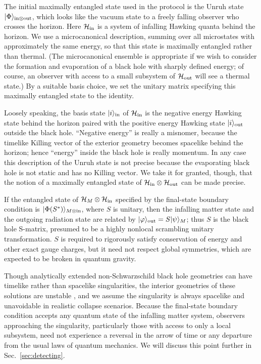 \documentclass[11pt]{article}
\begin{document}
The initial maximally entangled state used in the protocol is the Unruh state $|\Phi\rangle_{{\rm in}\otimes {\rm out}}$, which looks like the vacuum state to a freely falling observer who crosses the horizon. Here $\mathcal{H}_{\rm in}$ is a system of infalling Hawking quanta behind the horizon. We use a microcanonical description, summing over all microstates with approximately the same energy, so that this state is maximally entangled rather than thermal. (The microcanonical ensemble is appropriate if we wish to consider the formation and evaporation of a black hole with sharply defined energy; of course, an observer with access to a small subsystem of $\mathcal{H}_{\rm out}$ will see a thermal state.) By a suitable basis choice, we set the unitary matrix specifying this maximally entangled state to the identity. 

Loosely speaking, the basis state $|i\rangle_{\rm in}$ of $\mathcal{H}_{\rm in}$ is the negative energy Hawking state behind the horizon paired with the positive energy Hawking state $|i\rangle_{\rm out}$ outside the black hole. ``Negative energy'' is really a misnomer, because the timelike Killing vector of the exterior geometry becomes spacelike behind the horizon; hence ``energy'' inside the black hole is really momentum. In any case this description of the Unruh state is not precise because the evaporating black hole is not static and has no Killing vector. We take it for granted, though, that the notion of a maximally entangled state of $\mathcal{H}_{\rm in}\otimes \mathcal{H}_{\rm out}$ can be made precise.

If the entangled state of $\mathcal{H}_M\otimes \mathcal{H}_{\rm in}$ specified by the final-state boundary condition is  $|\Phi(S^*)\rangle_{M\otimes {\rm in}}$, where $S$ is unitary, then the infalling matter state and the outgoing radiation state are related by $|\varphi\rangle_{\rm out} = S |\psi\rangle_M$; thus $S$ is the black hole S-matrix, presumed to be a highly nonlocal scrambling unitary transformation. $S$ is required to rigorously satisfy conservation of energy and other exact gauge charges, but it need not respect global symmetries, which are expected to be broken in quantum gravity. 

Though analytically extended non-Schwarzschild black hole geometries can have timelike rather than spacelike singularities, the interior geometries of these solutions are unstable \cite{poisson}, and we assume the singularity is always spacelike and unavoidable in realistic collapse scenarios. Because the final-state boundary condition accepts any quantum state of the infalling matter system, observers approaching the singularity, particularly those with access to only a local subsystem, need not experience a reversal in the arrow of time or any departure from the usual laws of quantum mechanics. We will discuss this point further in Sec.~\ref{sec:detecting}.
\end{document}
